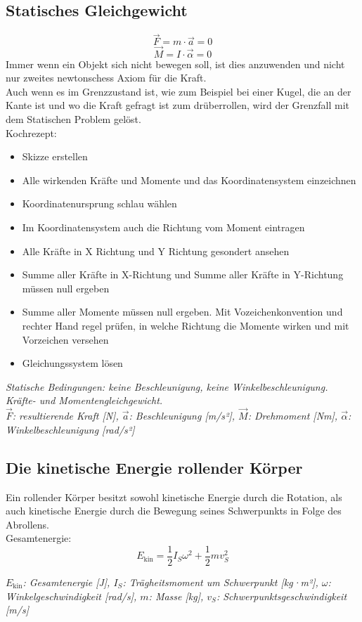 \documentclass[a4paper,10pt]{article}
\newenvironment{displayformula}
{
	\begin{framed}
		\color{formulaColor}
	}
	{\end{framed}}
\newcommand{\formulalegend}[1]{%
	\par\vspace{0.5ex}%
	{{\color{legendColor}\RaggedRight\small\textit{#1}}}%
	\par\vspace{1.5ex}%
}
\begin{document}
\subsection{Statisches Gleichgewicht}

\begin{displayformula}
	\[
	\vec{F} = m \cdot \vec{a} = 0
	\]
	\[
	\vec{M} = I \cdot \vec{\alpha} = 0
	\]
	Immer wenn ein Objekt sich nicht bewegen soll, ist dies anzuwenden und nicht nur zweites newtonschess Axiom für die Kraft. \\ Auch wenn es im Grenzzustand ist, wie zum Beispiel bei einer Kugel, die an der Kante ist und wo die Kraft gefragt ist zum drüberrollen, wird der Grenzfall mit dem Statischen Problem gelöst. \\ Kochrezept:
	\begin{itemize}
		\item Skizze erstellen
		\item Alle wirkenden Kräfte und Momente und das Koordinatensystem einzeichnen
		\item Koordinatenursprung schlau wählen
		\item Im Koordinatensystem auch die Richtung vom Moment eintragen
		\item Alle Kräfte in X Richtung und Y Richtung gesondert ansehen
		\item Summe aller Kräfte in X-Richtung und Summe aller Kräfte in Y-Richtung müssen null ergeben
		\item Summe aller Momente müssen null ergeben. Mit Vozeichenkonvention und rechter Hand regel prüfen, in welche Richtung die Momente wirken und mit Vorzeichen versehen
		\item Gleichungssystem lösen
	\end{itemize}
\end{displayformula}
\formulalegend{
	Statische Bedingungen: keine Beschleunigung, keine Winkelbeschleunigung. Kräfte- und Momentengleichgewicht.\\
	\( \vec{F} \): resultierende Kraft [N], \( \vec{a} \): Beschleunigung [m/s²], \( \vec{M} \): Drehmoment [Nm], \( \vec{\alpha} \): Winkelbeschleunigung [rad/s²]
}

\subsection{Die kinetische Energie rollender Körper}

\begin{displayformula}
	Ein rollender Körper besitzt sowohl kinetische Energie durch die Rotation, als auch kinetische Energie durch die Bewegung seines Schwerpunkts in Folge des Abrollens. \\ 
	Gesamtenergie:
	\[
	E_{\text{kin}} = \frac{1}{2} I_S \omega^2 + \frac{1}{2} m v_S^2
	\]
\end{displayformula}
\formulalegend{
	\( E_{\text{kin}} \): Gesamtenergie [J], \( I_S \): Trägheitsmoment um Schwerpunkt [kg·m²], \( \omega \): Winkelgeschwindigkeit [rad/s], \( m \): Masse [kg], \( v_S \): Schwerpunktsgeschwindigkeit [m/s]
}
\end{document}
